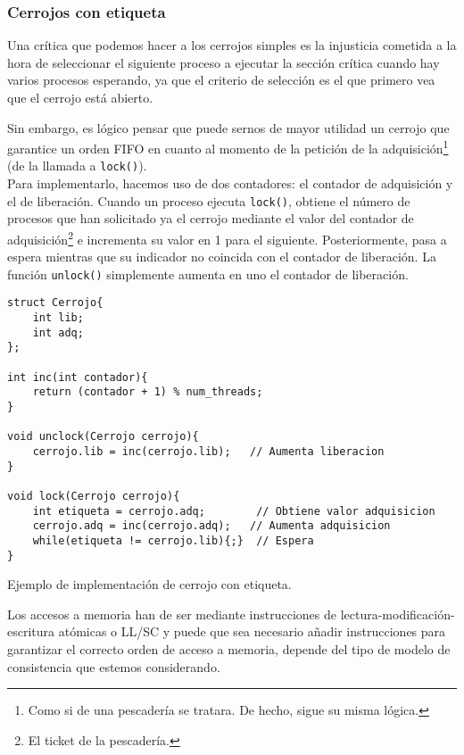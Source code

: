 \subsubsection{Cerrojos con etiqueta}
Una crítica que podemos hacer a los cerrojos simples es la injusticia cometida a la hora de seleccionar el siguiente proceso a ejecutar la sección crítica cuando hay varios procesos esperando, ya que el criterio de selección es el que primero vea que el cerrojo está abierto. 

Sin embargo, es lógico pensar que puede sernos de mayor utilidad un cerrojo que garantice un orden FIFO en cuanto al momento de la petición de la adquisición\footnote{Como si de una pescadería se tratara. De hecho, sigue su misma lógica.} (de la llamada a \verb|lock()|).\\

Para implementarlo, hacemos uso de dos contadores: el contador de adquisición y el de liberación. Cuando un proceso ejecuta \verb|lock()|, obtiene el número de procesos que han solicitado ya el cerrojo mediante el valor del contador de adquisición\footnote{El ticket de la pescadería.} e incrementa su valor en 1 para el siguiente. Posteriormente, pasa a espera mientras que su indicador no coincida con el contador de liberación. La función \verb|unlock()| simplemente aumenta en uno el contador de liberación.

\begin{listing}[H]
\begin{verbatim}
struct Cerrojo{
    int lib;
    int adq;
};

int inc(int contador){
    return (contador + 1) % num_threads;
}

void unclock(Cerrojo cerrojo){
    cerrojo.lib = inc(cerrojo.lib);   // Aumenta liberacion
}

void lock(Cerrojo cerrojo){
    int etiqueta = cerrojo.adq;        // Obtiene valor adquisicion
    cerrojo.adq = inc(cerrojo.adq);   // Aumenta adquisicion
    while(etiqueta != cerrojo.lib){;}  // Espera
}
\end{verbatim}
\caption{Ejemplo de implementación de cerrojo con etiqueta.}
\label{implementacion_cerrojo_etiqueta}
\end{listing}
Los accesos a memoria han de ser mediante instrucciones de lectura-modificación-escritura atómicas o LL/SC y puede que sea necesario añadir instrucciones para garantizar el correcto orden de acceso a memoria, depende del tipo de modelo de consistencia que estemos considerando.

